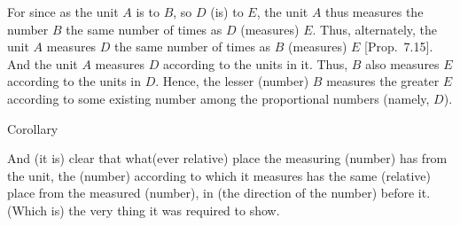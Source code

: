\begin{Parallel}{}{}
{For since as the unit $A$ is to $B$, so $D$ (is) to $E$,  the unit $A$ thus measures the number $B$ the same number of times as $D$ (measures) $E$. Thus,
alternately, the unit $A$ measures $D$ the same number of times as $B$
(measures) $E$ [Prop.~7.15]. And the unit $A$ measures $D$ according to the units in it. Thus, $B$ also measures $E$ according to the units in $D$. Hence, the lesser (number) $B$
measures the greater $E$ according to some existing number among the
proportional numbers (namely, $D$). \\

\begin{center}
{\large Corollary}
\end{center}\vspace*{-7pt}

And (it is) clear that what(ever relative) place the measuring (number) has from the unit,
the  (number) according to which it measures has the same (relative) place from the measured (number), in (the direction of the number)
before it. (Which is) the very thing it was required to show.}
\end{Parallel}

